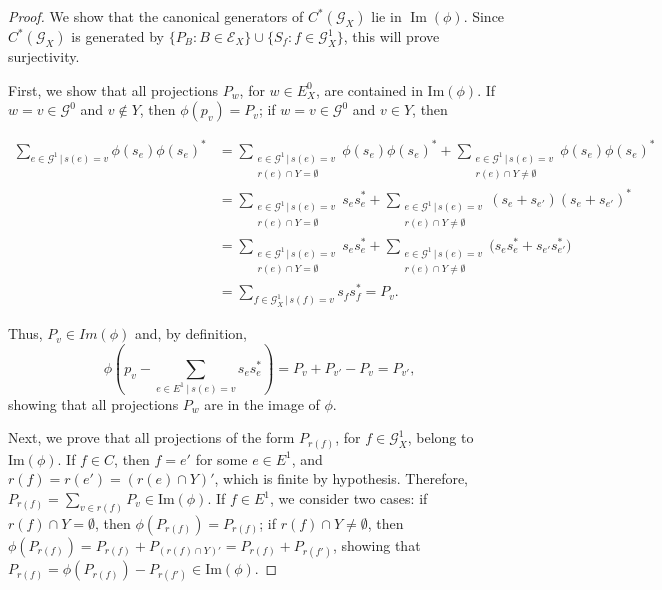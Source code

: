 \documentclass[12pt, reqno]{amsart}
\theoremstyle{definition}
\theoremstyle{remark}
\numberwithin{equation}{section}
\newcommand{\G}{\mathcal{G}}
\begin{document}
\begin{proof}
We show that the canonical generators of $C^*(\mathcal{G}_X)$ lie in $\operatorname{Im}(\phi)$.
Since $C^*(\mathcal{G}_X)$ is generated by $\{P_B : B\in \mathcal{E}_X\}\cup\{S_f : f\in \mathcal{G}_X^1\}$,
this will prove surjectivity.
     
First, we show that all projections \(P_w\), for \(w \in E^0_X\), are contained in \(\mathrm{Im}(\phi)\). If \(w = v \in \G^0\) and \(v \notin Y\), then \(\phi(p_v) = P_v\); if \(w = v \in \G^0\) and \(v \in Y\), then

 \begin{align*}
    \sum\limits_{e \in \G^1 \, | \, s(e) = v} \phi(s_e)\phi(s_e)^* 
    & = \sum\limits_{\substack{e \in \G^1 \, | \, s(e) = v \\ r(e) \cap Y = \emptyset}} \phi(s_e)\phi(s_e)^* 
    + \sum\limits_{\substack{e \in \G^1\, | \, s(e) = v \\ r(e) \cap Y \neq \emptyset}} \phi(s_e)\phi(s_e)^* \\
    & = \sum\limits_{\substack{e \in \G^1\, | \, s(e) = v \\ r(e) \cap Y = \emptyset}} s_es_e^* 
    + \sum\limits_{\substack{e \in \G^1 \, | \, s(e) = v \\ r(e) \cap Y \neq \emptyset}} (s_e + s_{e'})(s_e + s_{e'})^* \\
    & = \sum\limits_{\substack{e \in \G^1 \, | \, s(e) = v \\ r(e) \cap Y = \emptyset}} s_es_e^* 
    + \sum\limits_{\substack{e \in \G^1 \, | \, s(e) = v \\ r(e) \cap Y \neq \emptyset}} \big(s_es_e^* + s_{e'} s_{e'}^*\big) \\
    & = \sum\limits_{f \in \G^1_X \, | \, s(f) = v} s_fs_f^* = P_v.
\end{align*}

Thus, $P_v \in Im(\phi)$ and, by definition,
    $$\phi \left( p_v - \sum\limits_{e \in E^1 \ | \ s(e)  = v} s_es_e^*  \right) = P_v + P_{v'} - P_v = P_{v'}, $$
showing that all projections $P_w$ are in the image of $\phi$. 

Next, we prove that all projections of the form \(P_{r(f)}\), for \(f \in \G_X^1\), belong to \(\text{Im}(\phi)\). If \(f \in C\), then \(f = e'\) for some \(e \in E^1\), and \(r(f) = r(e') = (r(e) \cap Y)'\), which is finite by hypothesis. Therefore, \(P_{r(f)} = \sum_{v \in r(f)} P_v \in \text{Im}(\phi)\). If \(f \in E^1\), we consider two cases: if \(r(f) \cap Y = \emptyset\), then \(\phi(P_{r(f)}) = P_{r(f)}\); if \(r(f) \cap Y \neq \emptyset\), then \(\phi(P_{r(f)}) = P_{r(f)} + P_{(r(f) \cap Y)'} = P_{r(f)} + P_{r(f')}\), showing that \(P_{r(f)} = \phi(P_{r(f)}) - P_{r(f')} \in \text{Im}(\phi)\).



\end{proof}
\end{document}
